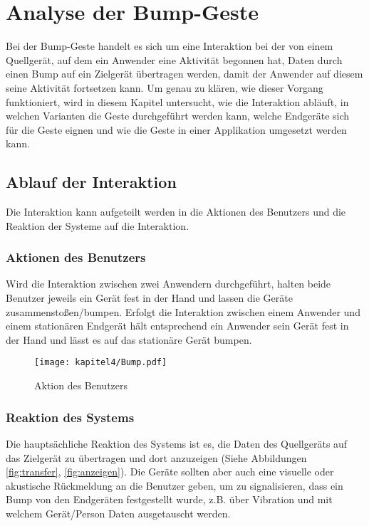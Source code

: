 \chapter{Analyse der Bump-Geste}
\label{Kap3}
\label{chap:Kap3}

Bei der Bump-Geste handelt es sich um eine Interaktion bei der von einem Quellgerät, auf dem ein Anwender eine Aktivität begonnen hat, Daten durch einen Bump auf ein Zielgerät übertragen werden, damit der Anwender auf diesem seine Aktivität fortsetzen kann. Um genau zu klären, wie dieser Vorgang funktioniert, wird in diesem Kapitel untersucht, wie die Interaktion abläuft, in welchen Varianten die Geste durchgeführt werden kann, welche Endgeräte sich für die Geste eignen und wie die Geste in einer Applikation umgesetzt werden kann.

\section{Ablauf der Interaktion}
Die Interaktion kann aufgeteilt werden in die Aktionen des Benutzers und die Reaktion der Systeme auf die Interaktion.

\subsection{Aktionen des Benutzers}
Wird die Interaktion zwischen zwei Anwendern durchgeführt, halten beide Benutzer jeweils ein Gerät fest in der Hand und lassen die Geräte zusammenstoßen/bumpen. Erfolgt die Interaktion zwischen einem Anwender und einem stationären Endgerät hält entsprechend ein Anwender sein Gerät fest in der Hand und lässt es auf das stationäre Gerät bumpen.

\begin{figure}[H]
    \centering
    \texttt{[image: kapitel4/Bump.pdf]}
    \label{actionUser}
\caption{Aktion des Benutzers}
\end{figure}


\subsection{Reaktion des Systems}
Die hauptsächliche Reaktion des Systems ist es, die Daten des Quellgeräts auf das Zielgerät zu übertragen und dort anzuzeigen (Siehe Abbildungen \ref{fig:transfer}, \ref{fig:anzeigen}). Die Geräte sollten aber auch eine visuelle oder akustische Rückmeldung an die Benutzer geben, um zu signalisieren, dass ein Bump von den Endgeräten festgestellt wurde, z.B. über Vibration und mit welchem Gerät/Person Daten ausgetauscht werden. 

